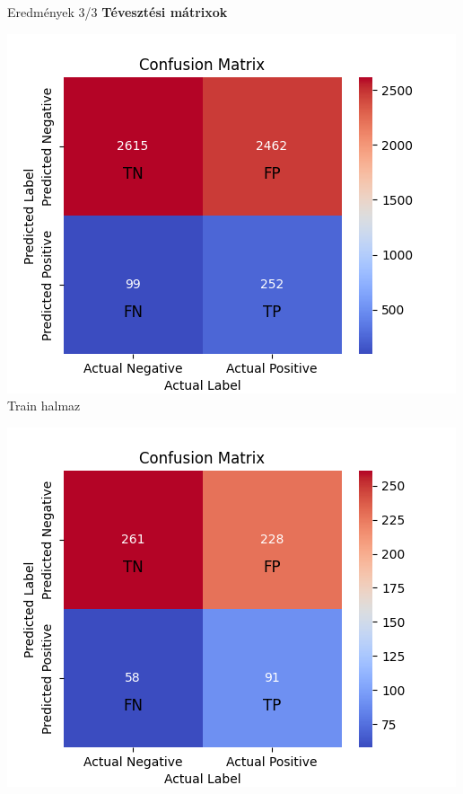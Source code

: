 \documentclass{beamer}
\begin{document}

    \begin{frame}{Eredmények 3/3}
    {\bf Tévesztési mátrixok}
    {\centering

        \begin{minipage}{0.32\linewidth}
            \centering
            \includegraphics[width=\linewidth]{graphics/WiC_confusion_matrix_abra.train.png}\\
            \small Train halmaz
        \end{minipage}
        \begin{minipage}{0.32\linewidth}
            \centering
            \includegraphics[width=\linewidth]{graphics/WiC_confusion_matrix_abra.dev.png}\\

\end{minipage}}
\end{frame}
\end{document}
